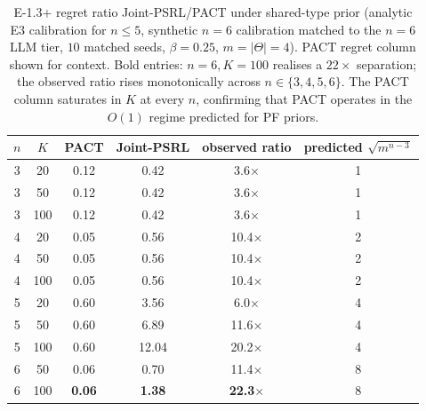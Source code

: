 \begin{table}[t]
\centering
\caption{E-1.3+ regret ratio Joint-PSRL/PACT under shared-type prior (analytic E3 calibration for $n{\le}5$, synthetic $n{=}6$ calibration matched to the $n{=}6$ LLM tier, $10$ matched seeds, $\beta{=}0.25$, $m{=}|\Theta|{=}4$). PACT regret column shown for context. Bold entries: $n{=}6, K{=}100$ realises a $22\!\times$ separation; the observed ratio rises monotonically across $n\!\in\!\{3,4,5,6\}$. The PACT column saturates in $K$ at every $n$, confirming that PACT operates in the $O(1)$ regime predicted for PF priors.}\label{tab:wave2-lb-ratio}
\small
\begin{tabular}{cccccc}
\toprule
$n$ & $K$ & PACT & Joint-PSRL & observed ratio & predicted $\sqrt{m^{n-3}}$ \\
\midrule
3 & 20  & 0.12 & 0.42  & 3.6$\times$  & 1 \\
3 & 50  & 0.12 & 0.42  & 3.6$\times$  & 1 \\
3 & 100 & 0.12 & 0.42  & 3.6$\times$  & 1 \\
4 & 20  & 0.05 & 0.56  & 10.4$\times$ & 2 \\
4 & 50  & 0.05 & 0.56  & 10.4$\times$ & 2 \\
4 & 100 & 0.05 & 0.56  & 10.4$\times$ & 2 \\
5 & 20  & 0.60 & 3.56  & 6.0$\times$  & 4 \\
5 & 50  & 0.60 & 6.89  & 11.6$\times$ & 4 \\
5 & 100 & 0.60 & 12.04 & 20.2$\times$ & 4 \\
6 & 50  & 0.06 & 0.70  & 11.4$\times$ & 8 \\
6 & 100 & \textbf{0.06} & \textbf{1.38} & \textbf{22.3}$\times$ & 8 \\
\bottomrule
\end{tabular}
\end{table}

